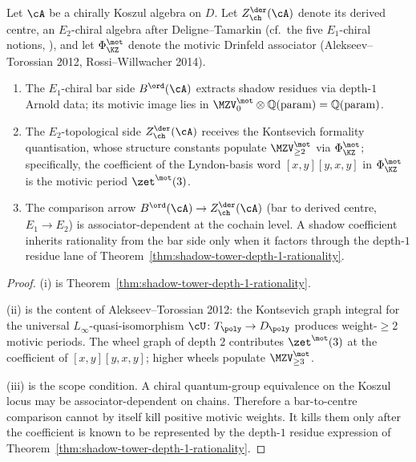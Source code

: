 \begin{theorem}
\ClaimStatusConditional
Let $\cA$ be a chirally Koszul algebra on $D$. Let
$Z^{\der}_{\ch}(\cA)$ denote its derived centre, an $E_2$-chiral
algebra after Deligne--Tamarkin (cf.\ the five $E_1$-chiral notions,
), and let $\Phi_{\KZ}^{\mot}$ denote the motivic Drinfeld
associator (Alekseev--Torossian 2012, Rossi--Willwacher 2014).
\begin{enumerate}
\item[(i)] The $E_1$-chiral bar side $B^{\ord}(\cA)$ extracts
shadow residues via depth-$1$ Arnold data; its motivic image lies in
$\MZV^{\mot}_0 \otimes \mathbb{Q}(\mathrm{param}) =
\mathbb{Q}(\mathrm{param})$.
\item[(ii)] The $E_2$-topological side
$Z^{\der}_{\ch}(\cA)$ receives the Kontsevich formality quantisation,
whose structure constants populate $\MZV^{\mot}_{\geq 2}$ via
$\Phi_{\KZ}^{\mot}$; specifically, the coefficient of the
Lyndon-basis word $[x, y] [y, x, y]$ in $\Phi_{\KZ}^{\mot}$ is the
motivic period $\zet^{\mot}(3)$.
\item[(iii)] The comparison arrow $B^{\ord}(\cA) \to Z^{\der}_{\ch}
(\cA)$ \textup{(}bar to derived centre, $E_1 \to E_2$\textup{)} is
associator-dependent at the cochain level. A shadow coefficient
inherits rationality from the bar side only when it factors through
the depth-$1$ residue lane of
Theorem~\ref{thm:shadow-tower-depth-1-rationality}.
\end{enumerate}
\end{theorem}

\begin{proof}
(i) is
Theorem~\ref{thm:shadow-tower-depth-1-rationality}.

(ii) is the content of Alekseev--Torossian 2012: the Kontsevich
graph integral for the universal $L_{\infty}$-quasi-isomorphism
$\cU \colon T_{\poly} \to D_{\poly}$ produces weight-$\geq 2$
motivic periods. The wheel graph of depth $2$ contributes
$\zet^{\mot}(3)$ at the coefficient of $[x, y] [y, x, y]$; higher
wheels populate $\MZV^{\mot}_{\geq 3}$.

(iii) is the scope condition. A chiral quantum-group equivalence on
the Koszul locus may be associator-dependent on chains. Therefore a
bar-to-centre comparison cannot by itself kill positive motivic
weights. It kills them only after the coefficient is known to be
represented by the depth-$1$ residue expression of
Theorem~\ref{thm:shadow-tower-depth-1-rationality}.
\end{proof}


